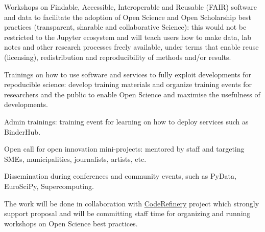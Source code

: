 \begin{task}[
  title=Training Workshops in reproducibility and community building,
  id=workshops,
  lead=UIO,
  PM=36,
  wphases={0-36!.75},
  partners={SRL}
]
\begin{compactitem}
   \item Workshops on Findable, Accessible, Interoperable and Reusable (FAIR) software and data to facilitate the adoption of Open Science and Open Scholarship best practices (transparent, sharable and collaborative Science): this would not be restricted to the Jupyter ecosystem and will teach users how to make data, lab notes and other research processes freely available, under terms that enable reuse (licensing), redistribution and reproducibility of methods and/or results.

   \item Trainings on how to use \TheProject software and services to fully exploit \TheProject developments for repoducible science: develop training materials and organize training events for researchers and the public to enable Open Science and maximise the usefulness of \TheProject developments.

   \item \TheProject Admin trainings: training event for learning on how to deploy \TheProject services such as BinderHub.

   \item Open call for open innovation mini-projects: mentored by \TheProject staff and targeting SMEs, municipalities, journalists, artists, etc.

   \item Dissemination during conferences and community events, such as PyData, EuroSciPy, Supercomputing.

  \end{compactitem}
 The work will be done in collaboration with \href{https://coderefinery.org}{CodeRefinery} project which strongly support \TheProject proposal and will be committing staff time for organizing and running workshops on Open Science best practices.
\end{task}
